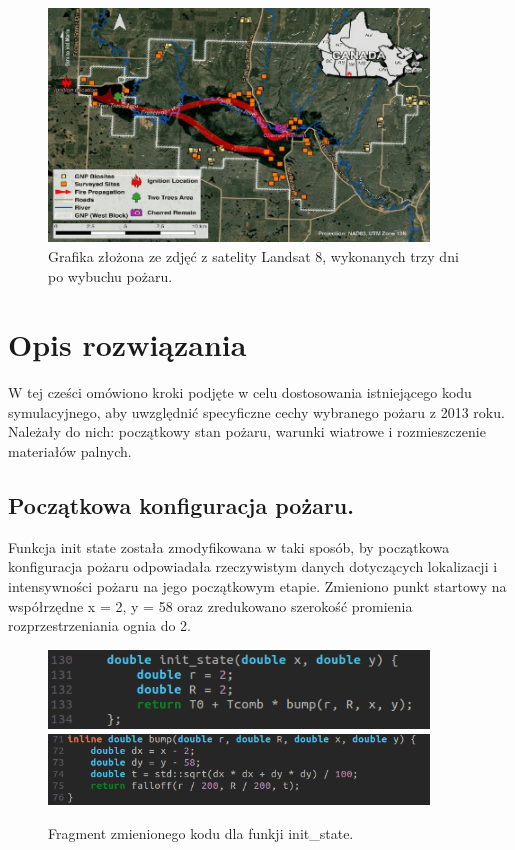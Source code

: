 \documentclass[a4paper,12pt]{article}
\begin{document}
\begin{figure}[H]
    \centering
    \includegraphics[width=0.9\textwidth]{fire-map-1.png}
    \caption{Grafika złożona ze zdjęć z satelity Landsat 8, wykonanych trzy dni po wybuchu pożaru.}
    \label{fig:example}
\end{figure}
        
\section{Opis rozwiązania}
W tej cześci omówiono kroki podjęte w celu dostosowania istniejącego kodu symulacyjnego, aby uwzględnić specyficzne cechy wybranego pożaru z 2013 roku. Należały do nich: początkowy stan pożaru, warunki wiatrowe i rozmieszczenie materiałów palnych.

\subsection{Początkowa konfiguracja pożaru.}
Funkcja init state została zmodyfikowana w taki sposób, by początkowa konfiguracja pożaru odpowiadała rzeczywistym danych dotyczących lokalizacji i intensywności pożaru na jego początkowym etapie. Zmieniono punkt startowy na współrzędne x = 2, y = 58 oraz zredukowano szerokość promienia rozprzestrzeniania ognia do 2. 

\begin{figure}[H]
    \centering
    \includegraphics[width=0.9\textwidth]{init_state.png}
    \includegraphics[width=0.9\textwidth]{init_state1.png}
    \caption{Fragment zmienionego kodu dla funkji init_state.}
    \label{fig:example}
\end{figure}
\newpage
\end{document}
